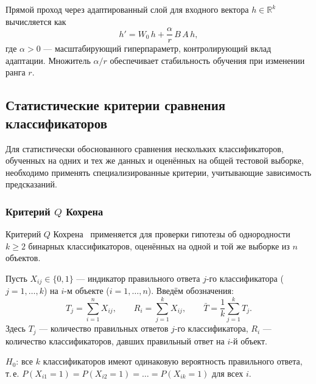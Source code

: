 Прямой проход через адаптированный слой для входного вектора
$h \in \mathbb{R}^k$ вычисляется как
\begin{equation}
    h' = W_0\,h + \frac{\alpha}{r}\,B\,A\,h,
    \label{eq:lora-forward}
\end{equation}
где $\alpha > 0$ --- масштабирующий гиперпараметр, контролирующий вклад
адаптации. Множитель $\alpha / r$ обеспечивает стабильность обучения
при изменении ранга $r$.


\subsection{Статистические критерии сравнения классификаторов}
\label{subsec:statistical-tests}

Для статистически обоснованного сравнения нескольких классификаторов,
обученных на одних и тех же данных и оценённых на общей тестовой выборке,
необходимо применять специализированные критерии, учитывающие зависимость
предсказаний.

\subsubsection{Критерий $Q$ Кохрена}
\label{subsubsec:cochran}

Критерий $Q$ Кохрена~\cite{cochran1950comparison} применяется для проверки
гипотезы об однородности $k \geqslant 2$ бинарных классификаторов,
оценённых на одной и той же выборке из $n$ объектов.

Пусть $X_{ij} \in \{0, 1\}$ --- индикатор правильного ответа $j$-го
классификатора ($j = 1, \ldots, k$) на $i$-м объекте ($i = 1, \ldots, n$).
Введём обозначения:
\begin{equation}
    T_j = \sum_{i=1}^{n} X_{ij}, \qquad
    R_i = \sum_{j=1}^{k} X_{ij}, \qquad
    \bar{T} = \frac{1}{k}\sum_{j=1}^{k} T_j.
    \label{eq:cochran-notation}
\end{equation}
Здесь $T_j$ --- количество правильных ответов $j$-го классификатора,
$R_i$ --- количество классификаторов, давших правильный ответ на $i$-й объект.

\begin{definition}
\label{def:cochran-h0}
$H_0$: все $k$ классификаторов имеют одинаковую вероятность правильного
ответа, т.\,е.
$P(X_{i1} = 1) = P(X_{i2} = 1) = \ldots = P(X_{ik} = 1)$
для всех $i$.
\end{definition}

